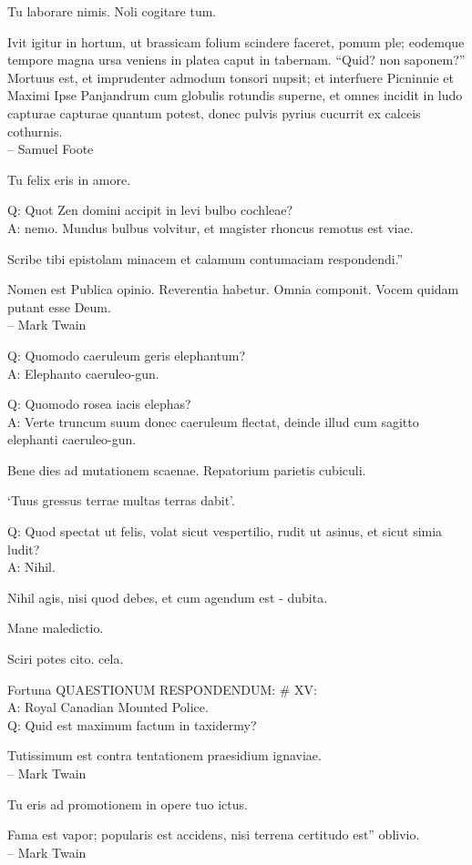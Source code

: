 \documentclass[titlepage,12pt]{memoir}
\begin{document}
Tu laborare nimis. Noli cogitare tum.

Ivit igitur in hortum, ut brassicam folium scindere faceret, pomum ple;
eodemque tempore magna ursa veniens in platea caput
in tabernam. “Quid? non saponem?” Mortuus est, et imprudenter admodum
tonsori nupsit; et interfuere Picninnie et Maximi
Ipse Panjandrum cum globulis rotundis superne, et omnes
incidit in ludo capturae capturae quantum potest, donec pulvis pyrius cucurrit
ex calceis cothurnis.
\\-- Samuel Foote

Tu felix eris in amore.

Q: Quot Zen domini accipit in levi bulbo cochleae?\\
A: nemo. Mundus bulbus volvitur, et magister rhoncus remotus est
viae.

Scribe tibi epistolam minacem et calamum contumaciam respondendi.”

Nomen est Publica opinio. Reverentia habetur. Omnia componit.
Vocem quidam putant esse Deum.
\\-- Mark Twain

Q: Quomodo caeruleum geris elephantum?\\
A: Elephanto caeruleo-gun.

Q: Quomodo rosea iacis elephas?\\
A: Verte truncum suum donec caeruleum flectat, deinde illud cum sagitto
elephanti caeruleo-gun.

Bene dies ad mutationem scaenae. Repatorium parietis cubiculi.

‘Tuus gressus terrae multas terras dabit’.

Q: Quod spectat ut felis, volat sicut vespertilio, rudit ut asinus, et
sicut simia ludit?\\
A: Nihil.

Nihil agis, nisi quod debes, et cum agendum est - dubita.

Mane maledictio.

Sciri potes cito. cela.

Fortuna QUAESTIONUM RESPONDENDUM: \# XV:\\
A: Royal Canadian Mounted Police.
\\Q: Quid est maximum factum in taxidermy?

Tutissimum est contra tentationem praesidium ignaviae.
\\-- Mark Twain

Tu eris ad promotionem in opere tuo ictus.

Fama est vapor; popularis est accidens, nisi terrena certitudo est”
oblivio.
\\-- Mark Twain
\end{document}
